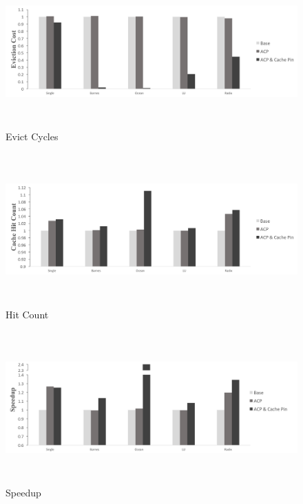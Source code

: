 \documentclass[conference]{IEEEtran}
\begin{document}
\begin{figure}[!h]
\centering
\captionsetup{justification=centering}
\includegraphics[width=7.35in,height=2.3in]{evict_cycles.png}
\caption{Evict Cycles}
\label{evict_cycles}
\end{figure}

\begin{figure}[!h]
\centering
\captionsetup{justification=centering}
\includegraphics[width=7.35in,height=2.3in]{hit_count.png}
\caption{Hit Count}
\label{hit_count}
\end{figure}

\begin{figure}[!h]
\centering
\captionsetup{justification=centering}
\includegraphics[width=7.35in,height=2.3in]{speedup.png}
\caption{Speedup}
\label{speedup}
\end{figure}
\end{document}
